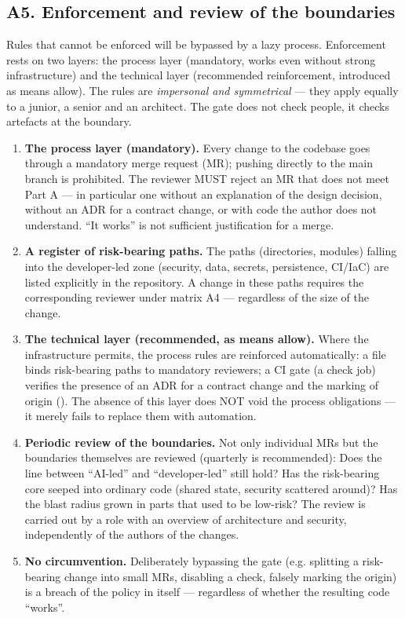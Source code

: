 \subsection{A5. Enforcement and review of the boundaries}

Rules that cannot be enforced will be bypassed by a lazy process.
Enforcement rests on two layers: the process layer (mandatory, works even without strong infrastructure) and the technical layer (recommended reinforcement, introduced as means allow).
The rules are \emph{impersonal and symmetrical} --- they apply equally to a junior, a senior and an architect. The gate does not check people, it checks artefacts at the boundary.

\begin{enumerate}[label=\textbf{A5.\arabic*}]
\item \textbf{The process layer (mandatory).}
Every change to the codebase goes through a mandatory merge request (MR); pushing directly to the main branch is prohibited.
The reviewer MUST reject an MR that does not meet Part A --- in particular one without an explanation of the design decision, without an ADR for a contract change, or with code the author does not understand.
\enquote{It works} is not sufficient justification for a merge.
\item \textbf{A register of risk-bearing paths.}
The paths (directories, modules) falling into the developer-led zone (security, data, secrets, persistence, CI/IaC) are listed explicitly in the repository.
A change in these paths requires the corresponding reviewer under matrix A4 --- regardless of the size of the change.
\item \textbf{The technical layer (recommended, as means allow).}
Where the infrastructure permits, the process rules are reinforced automatically:
a  file binds risk-bearing paths to mandatory reviewers;
a CI gate (a check job) verifies the presence of an ADR for a contract change and the marking of origin (\code{[ai-generated]}).
The absence of this layer does NOT void the process obligations --- it merely fails to replace them with automation.
\item \textbf{Periodic review of the boundaries.}
Not only individual MRs but the boundaries themselves are reviewed (quarterly is recommended):
Does the line between \enquote{AI-led} and \enquote{developer-led} still hold?
Has the risk-bearing core seeped into ordinary code (shared state, security scattered around)?
Has the blast radius grown in parts that used to be low-risk?
The review is carried out by a role with an overview of architecture and security, independently of the authors of the changes.
\item \textbf{No circumvention.}
Deliberately bypassing the gate (e.g. splitting a risk-bearing change into small MRs, disabling a check, falsely marking the origin) is a breach of the policy in itself --- regardless of whether the resulting code \enquote{works}.
\end{enumerate}

